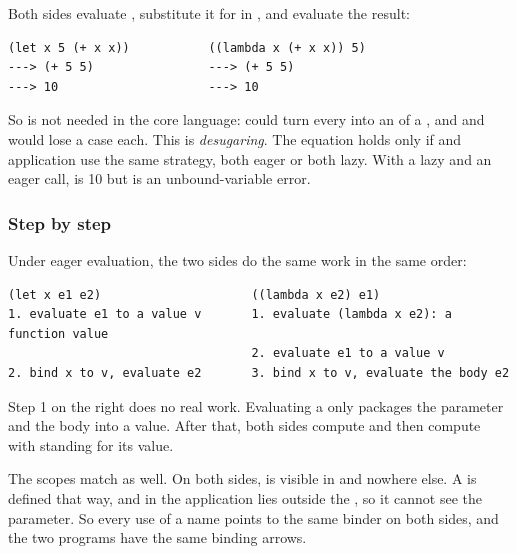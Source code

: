 Both sides evaluate , substitute it for  in , and evaluate the result:
\begin{lstlisting}[style=repl]
(let x 5 (+ x x))           ((lambda x (+ x x)) 5)
---> (+ 5 5)                ---> (+ 5 5)
---> 10                     ---> 10
\end{lstlisting}
So  is not needed in the core language:  could turn every  into an  of a , and  and  would lose a case each. This is \emph{desugaring}. The equation holds only if  and application use the same strategy, both eager or both lazy. With a lazy  and an eager call,  is 10 but  is an unbound-variable error.

\subsubsection{Step by step} Under eager evaluation, the two sides do the same work in the same order:
\begin{lstlisting}[style=repl]
(let x e1 e2)                     ((lambda x e2) e1)
1. evaluate e1 to a value v       1. evaluate (lambda x e2): a function value
                                  2. evaluate e1 to a value v
2. bind x to v, evaluate e2       3. bind x to v, evaluate the body e2
\end{lstlisting}
Step 1 on the right does no real work. Evaluating a  only packages the parameter and the body into a value. After that, both sides compute  and then compute  with  standing for its value.

The scopes match as well. On both sides,  is visible in  and nowhere else. A  is defined that way, and in the application  lies outside the , so it cannot see the parameter. So every use of a name points to the same binder on both sides, and the two programs have the same binding arrows.

